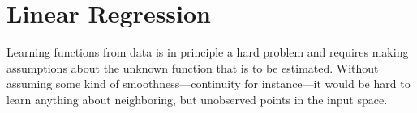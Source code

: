 \documentclass[../thesis.tex]{subfiles}
\begin{document}
% 


\section{Linear Regression}
Learning functions from data is in principle a hard problem and requires making assumptions about the unknown function that is to be estimated. Without assuming some kind of smoothness---continuity for instance---it would be hard to learn anything about neighboring, but unobserved points in the input space.
\end{document}
